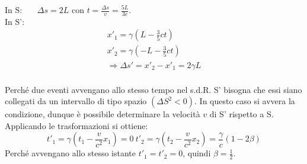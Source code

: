\documentclass[12pt,twoside,a4]{article}
\begin{document}
\newpage
\begin{solution}
 In S: \ \ \ $\Delta s = 2L$ con $t = \frac{\Delta s}{v} = \frac{5 L }{3 c}$. \\
 In S':
 \begin{gather}
    x'_1 = \gamma (L - \frac{3}{5} c t) \\
    x'_2 = \gamma (- L - \frac{3}{5} c t) \\
    \Rightarrow   \Delta s' = x'_2 - x'_1 = 2\gamma L \\     
 \end{gather}
 \end{solution}

 \begin{solution}
	 Perché due eventi avvengano allo stesso tempo nel s.d.R. S' bisogna che essi siano collegati da un intervallo di tipo spazio $(\Delta S^2 < 0)$. In questo caso si avvera la condizione, dunque è possibile determinare la velocità $v$ di S' rispetto a S. Applicando le trasformazioni si ottiene: 
 \begin{equation*}
    t'_1 = \gamma \left(t_1 - \frac{v}{c^2} x_1 \right) = 0  \  t'_2 = \gamma \left(t_2 - \frac{v}{c^2} x_2 \right) = \frac{\gamma}{c} (1-2\beta)     
 \end{equation*}
 Perché avvengano allo stesso istante $t'_1 = t'_2 = 0$, quindi $\beta = \frac{1}{2}$.
\end{solution}
\end{document}
